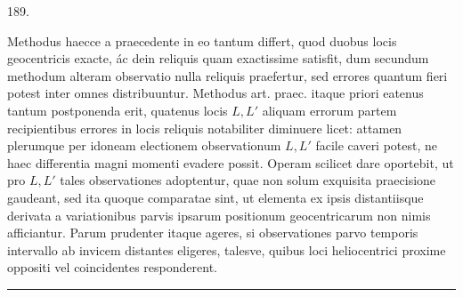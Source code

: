 \begin{center}\hypertarget{native-262-article189}{}189.\end{center}
Methodus haecce a praecedente in eo tantum differt, quod duobus locis
geocentricis exacte, \'{a}c dein reliquis quam exactissime satisfit, dum secundum
methodum alteram observatio nulla reliquis praefertur, sed errores quantum
fieri potest inter omnes distribuuntur\rlap{\raisebox{1.4ex}{\rule{.6em}{.35pt}}}. Methodus art. praec. itaque priori
eatenus tantum postponenda erit, quatenus locis $L,L'$ aliquam errorum partem
recipientibus errores in locis reliquis notabiliter diminuere licet: attamen plerumque
per idoneam electionem observationum $L,L'$ facile caveri potest, ne
haec differentia magni momenti evadere possit. Operam scilicet dare oportebit,
ut pro $L,L'$ tales observationes adoptentur, quae non solum exquisita
praecisione gaudeant, sed ita quoque comparatae sint, ut elementa ex ipsis
distantiisque derivata a variationibus parvis ipsarum positionum geocentricarum
non nimis afficiantur. Parum prudenter itaque ageres, si observationes parvo
temporis intervallo ab invicem distantes eligeres, talesve, quibus loci heliocentrici
proxime oppositi vel coincidentes responderent.
\begin{center}\rule{3cm}{.4pt}\end{center}
